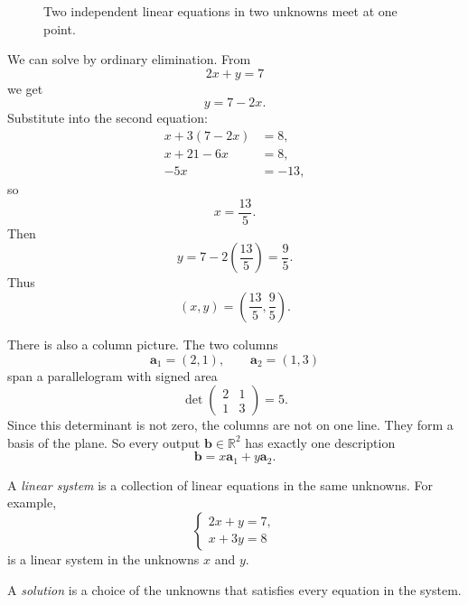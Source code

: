 \begin{figure}[h]
\centering
{}
\caption{Two independent linear equations in two unknowns meet at one point.}
\end{figure}

We can solve by ordinary elimination.  From
\[
    2x+y=7
\]
we get
\[
    y=7-2x.
\]
Substitute into the second equation:
\[
\begin{aligned}
    x+3(7-2x)&=8,\\
    x+21-6x&=8,\\
    -5x&=-13,
\end{aligned}
\]
so
\[
    x=\frac{13}{5}.
\]
Then
\[
    y=7-2\left(\frac{13}{5}\right)=\frac95.
\]
Thus
\[
\boxed{
    (x,y)=\left(\frac{13}{5},\frac95\right).
}
\]

There is also a column picture.  The two columns
\[
    \mathbf a_1=(2,1),
    \qquad
    \mathbf a_2=(1,3)
\]
span a parallelogram with signed area
\[
    \det
    \begin{pmatrix}
        2&1\\
        1&3
    \end{pmatrix}
    =
    5.
\]
Since this determinant is not zero, the columns are not on one line.  They form a
basis of the plane.  So every output \(\mathbf b\in\mathbb R^2\) has exactly one
description
\[
    \mathbf b=x\mathbf a_1+y\mathbf a_2.
\]

\begin{definition}
A \emph{linear system} is a collection of linear equations in the same unknowns.
For example,
\[
\begin{cases}
2x+y=7,\\
x+3y=8
\end{cases}
\]
is a linear system in the unknowns \(x\) and \(y\).

A \emph{solution} is a choice of the unknowns that satisfies every equation in the
system.
\end{definition}

